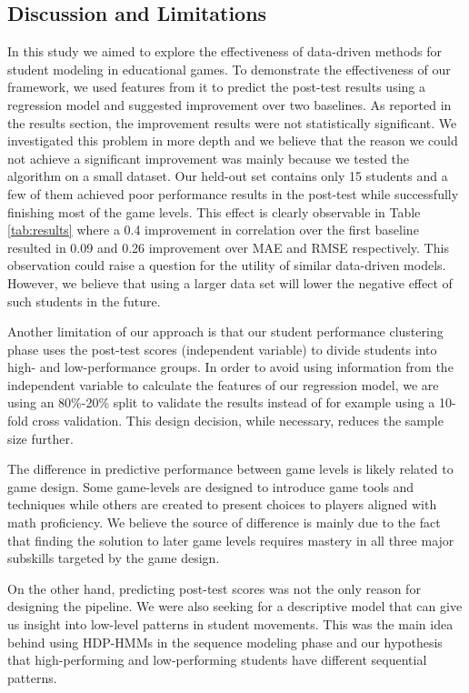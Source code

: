 \documentclass{sigchi}
\begin{document}
	\subsection{Discussion and Limitations}
	
	
	In this study we aimed to explore the effectiveness of data-driven methods for student modeling in educational games. 
	To demonstrate the effectiveness of our framework, we used features from it to predict the post-test results using a regression model and suggested improvement over two  baselines.
	As reported in the results section, the improvement results were not statistically significant. We investigated this problem in more depth and we believe that the reason we could not achieve a significant improvement was mainly because we tested the algorithm on a small dataset.
	Our held-out set contains only 15 students and a few of them achieved poor performance results in the post-test while successfully finishing most of the game levels.
	This effect is clearly observable in Table \ref{tab:results} where a 0.4 improvement in correlation over the first baseline resulted in 0.09 and 0.26 improvement over MAE and RMSE respectively. 
	This observation could raise a question for the utility of similar data-driven models.
	However, we believe that using a larger data set will lower the negative effect of such students in the future.
	
	Another limitation of our approach is that our student performance clustering phase uses the post-test scores (independent variable) to divide students into high- and low-performance groups. 
	In order to avoid using information from the independent variable to calculate the features of our regression model, we are using an 80\%-20\% split to validate the results instead of for example using a 10-fold cross validation.
	This design decision, while necessary, reduces the sample size further.
	
	The difference in predictive performance between game levels is likely related to game design. 
	Some game-levels are designed to introduce game tools and techniques while others are created to present choices to players aligned with math proficiency.
	We believe the source of difference is mainly due to the fact that finding the solution to later game levels requires mastery in all three major subskills targeted by the game design.
	
	On the other hand, predicting post-test scores was not the only reason for designing the pipeline.
	We were also seeking for a descriptive model that can give us insight into low-level patterns in student movements. 
	This was the main idea behind using HDP-HMMs in the sequence modeling phase and our hypothesis that high-performing and low-performing students have different sequential patterns. 
	
\end{document}

